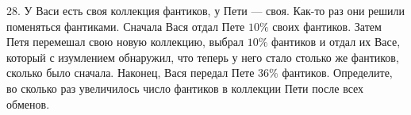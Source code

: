 28. У Васи есть своя коллекция фантиков, у Пети --- своя. Как-то раз они решили поменяться фантиками. Сначала Вася отдал Пете $10\%$ своих фантиков. Затем Петя перемешал свою новую коллекцию, выбрал $10\%$ фантиков и отдал их Васе, который с изумлением обнаружил, что теперь у него стало столько же фантиков, сколько было сначала. Наконец, Вася передал Пете $36\%$ фантиков. Определите, во сколько раз увеличилось число фантиков в коллекции Пети после всех обменов.\\
